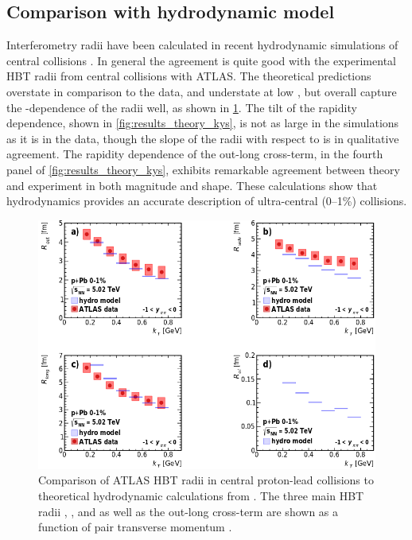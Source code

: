 \subsection{Comparison with hydrodynamic model}

Interferometry radii have been calculated in recent hydrodynamic simulations of central \pPb collisions \cite{Bozek:2017bwp}.
In general the agreement is quite good with the experimental HBT radii from central collisions with ATLAS.
The theoretical predictions overstate \Rside in comparison to the data, and understate \Rlong at low \kt, but overall capture the \kt-dependence of the radii well, as shown in \cref{fig:results_theory_kt}.
The tilt of the rapidity dependence, shown in \cref{fig:results_theory_kys}, is not as large in the simulations as it is in the data, though the slope of the radii with respect to \kys is in qualitative agreement.
The rapidity dependence of the out-long cross-term, in the fourth panel of \cref{fig:results_theory_kys}, exhibits remarkable agreement between theory and experiment in both magnitude and shape.
These calculations show that hydrodynamics provides an accurate description of ultra-central (0--1\%) \pPb collisions.

\begin{figure}[t]
\centering
\includegraphics[width=\linewidth]{theory_bozek_kt.png}
\caption{Comparison of ATLAS HBT radii in central proton-lead collisions to theoretical hydrodynamic calculations from . The three main HBT radii \Rout, \Rside, and \Rlong as well as the out-long cross-term \Rol are shown as a function of pair transverse momentum \kt.}
\label{fig:results_theory_kt}
\end{figure}

